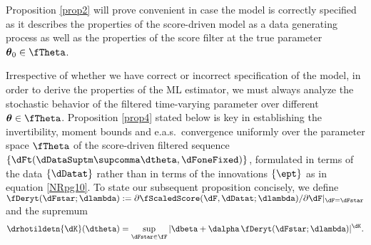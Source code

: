 


Proposition \ref{prop2} will prove convenient in case the model is correctly specified as it describes the properties of the score-driven model as a data generating process as well as the properties of the score filter at the true parameter $\boldsymbol{\theta}_{0} \in \fTheta$.


Irrespective of whether we have correct or incorrect specification of the model, in order to derive the properties of the ML estimator,  we must always analyze the stochastic behavior of the filtered time-varying parameter over different $\boldsymbol{\theta} \in \fTheta$.
Proposition \ref{prop4} stated below is key in establishing the invertibility, moment bounds and e.a.s.\ convergence uniformly over the parameter space $\fTheta$ of the score-driven filtered sequence
$\{\dFt(\dDataSuptm\supcomma \dtheta,\dFoneFixed)\}$, formulated in terms of the data $\{\dDatat\}$ rather than in terms of the innovations $\{\ept\}$ as in equation \eqref{NRpg10}.
To state our subsequent proposition concisely, we define 
$\fDeryt(\dFstar;\dlambda) := \partial \fScaledScore  (\dF, \dDatat; \dlambda)/\partial \dF|_{\dF=\dFstar}$ 
and the supremum 
\begin{align} \label{DefRhoTilde}
    \drhotildetn{\dK}(\dtheta) = \sup_{\dFstar \in \fF}
    | \dbeta + \dalpha\, \fDeryt(\dFstar;\dlambda)|^{\dK}.%
\end{align}

